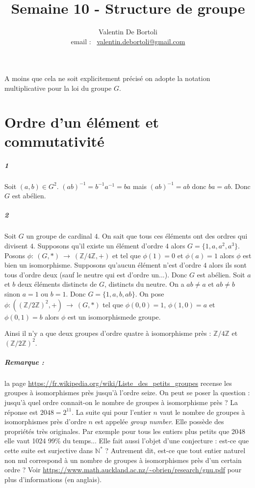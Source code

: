\documentclass[10pt,a4paper]{article}
\title{Semaine 10 - Structure de groupe}
\author{Valentin De Bortoli \\ email : \ \href{mailto:valentin.debortoli@gmail.com}{valentin.debortoli@gmail.com}}
\date{}
\begin{document}
\maketitle
A moins que cela ne soit explicitement précisé on adopte la notation multiplicative pour la loi du groupe $G$.
\section{Ordre d'un élément et commutativité}
\subparagraph{1}Soit $(a,b) \in G^2$. $(ab)^{-1} = b^{-1}a^{-1} = ba$ mais $(ab)^{-1} = ab$ donc $ba =ab$. Donc $G$ est abélien.
\subparagraph{2}Soit $G$ un groupe de cardinal $4$. On sait que tous ces éléments ont des ordres qui divisent $4$. Supposons qu'il existe un élément d'ordre $4$ alors $G = \lbrace 1,a,a^2,a^3 \rbrace$. Posons $\phi: \ (G,*) \ \rightarrow \ (\mathbb{Z} / 4\mathbb{Z}, +)$ et tel que $\phi(1) = 0$ et $\phi(a) = 1$ alors $\phi$ est bien un isomorphisme. Supposons qu'aucun élément n'est d'ordre $4$ alors ils sont tous d'ordre deux (sauf le neutre qui est d'ordre un...). Donc $G$ est abélien. Soit $a$ et $b$ deux éléments distincts de $G$, distincts du neutre. On a $ab \neq a$ et $ab \neq b$ sinon $a = 1$ ou $b=1$. Donc $G = \lbrace 1,a,b,ab \rbrace$. On pose $\phi: \left(\left( \mathbb{Z}/2\mathbb{Z} \right)^2,+\right) \ \rightarrow \ (G,*)$ tel que $\phi(0,0) = 1$, $\phi(1,0) = a$ et $\phi(0,1) = b$ alors $\phi$ est un isomorphismede groupe.

Ainsi il n'y a que deux groupes d'ordre quatre à isomorphisme près : $\mathbb{Z}/4\mathbb{Z}$ et $\left( \mathbb{Z}/2\mathbb{Z} \right)^2$.

\subparagraph{Remarque :} la page \url{https://fr.wikipedia.org/wiki/Liste_des_petits_groupes} recense les groupes à isomorphismes près jusqu'à l'ordre seize. On peut se poser la question : jusqu'à quel ordre connait-on le nombre de groupes à isomorphisme près ? La réponse est $2048 = 2^{11}$. La suite qui pour l'entier $n$ vaut le nombre de groupes à isomorphismes près d'ordre $n$ est appelée \textit{group number}. Elle possède des propriétés très originales. Par exemple pour tous les entiers plus petits que 2048 elle vaut 1024 99\% du temps... Elle fait aussi l'objet d'une conjecture : est-ce que cette suite est surjective dans $\mathbb{N}^*$ ? Autrement dit, est-ce que tout entier naturel non nul correspond à un nombre de groupes à isomorphismes près d'un certain ordre ? Voir \url{https://www.math.auckland.ac.nz/~obrien/research/gnu.pdf} pour plus d'informations (en anglais).
\end{document}
